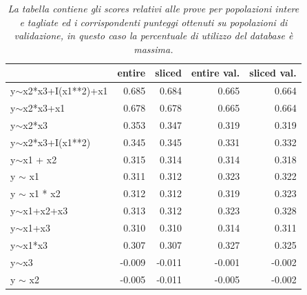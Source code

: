 \documentclass[a4paper]{report}
\begin{document}
\begin{table}[h!btp]
\begin{tabular}{lrrrr}
\toprule
{} &  entire &  sliced &  entire val. &  sliced val. \\
\midrule
y$\sim$x2*x3+I(x1**2)+x1 &         0.685 &         0.684 &             0.665 &             0.664 \\
y$\sim$x2*x3+x1          &         0.678 &         0.678 &             0.665 &             0.664 \\
y$\sim$x2*x3             &         0.353 &         0.347 &             0.319 &             0.319 \\
y$\sim$x2*x3+I(x1**2)    &         0.345 &         0.345 &             0.331 &             0.332 \\
y$\sim$x1 + x2           &         0.315 &         0.314 &             0.314 &             0.318 \\
y $\sim$ x1              &         0.311 &         0.312 &             0.323 &             0.322 \\
y $\sim$ x1 * x2         &         0.312 &         0.312 &             0.319 &             0.323 \\
y$\sim$x1+x2+x3          &         0.313 &         0.312 &             0.323 &             0.328 \\
y$\sim$x1+x3             &         0.310 &         0.310 &             0.314 &             0.311 \\
y$\sim$x1*x3             &         0.307 &         0.307 &             0.327 &             0.325 \\
y$\sim$x3                &        -0.009 &        -0.011 &            -0.001 &            -0.002 \\
y $\sim$ x2              &        -0.005 &        -0.011 &            -0.005 &            -0.002 \\
\bottomrule
\end{tabular}
\caption{\textit{La tabella contiene gli scores relativi alle prove per popolazioni intere e tagliate ed i corrispondenti punteggi  ottenuti su popolazioni di validazione, in questo caso la percentuale di utilizzo del database è massima.}}
\end{table}
\end{document}
